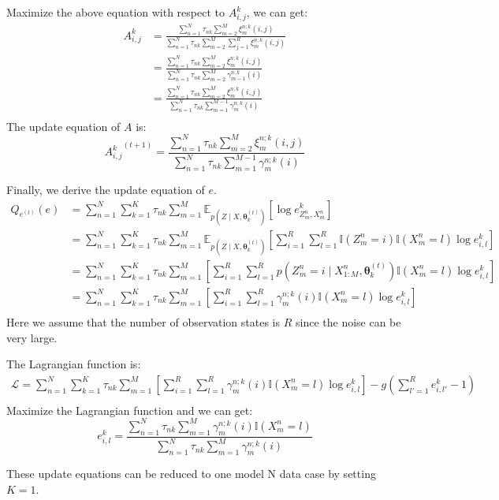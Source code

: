 \documentclass[12pt]{article}
\newenvironment{problem}[2][Problem]{\begin{trivlist}
\item[\hskip \labelsep {\bfseries #1}\hskip \labelsep {\bfseries #2.}]}{\end{trivlist}}
\begin{document}
\begin{problem}{2.7.21}
Maximize the above equation with respect to $A^k_{i,j}$, we can get:
\begin{align*}
    A^k_{i,j}&= \frac{\sum_{n=1}^{N} \tau_{nk} \sum_{m=2}^{M} \xi_{m}^{n;k}(i,j)}
                     {\sum_{n=1}^{N} \tau_{nk} \sum_{m=2}^{M} \sum_{j=1}^{R} \xi_{m}^{n;k}(i,j)} \\
             &= \frac{\sum_{n=1}^{N} \tau_{nk} \sum_{m=2}^{M} \xi_{m}^{n;k}(i,j)}
                     {\sum_{n=1}^{N} \tau_{nk} \sum_{m=2}^{M} \gamma_{m-1}^{n;k}(i)} \\
             &= \frac{\sum_{n=1}^{N} \tau_{nk} \sum_{m=2}^{M} \xi_{m}^{n;k}(i,j)}
                     {\sum_{n=1}^{N} \tau_{nk} \sum_{m=1}^{M-1} \gamma_{m}^{n;k}(i)} \\
\end{align*}
The update equation of $A$ is:
\begin{equation}
    {A^k_{i,j}}^{(t+1)} = 
        \frac{\sum_{n=1}^{N} \tau_{nk} \sum_{m=2}^{M} \xi_{m}^{n;k}(i,j)}
             {\sum_{n=1}^{N} \tau_{nk} \sum_{m=1}^{M-1} \gamma_{m}^{n;k}(i)}
\end{equation}

Finally, we derive the update equation of $e$.
\begin{align*}
    Q_{e^{(t)}}(e) &= \sum_{n=1}^{N} \sum_{k=1}^{K} \tau_{nk} \sum_{m=1}^{M} 
        \mathbb{E}_{p(Z\mid X, \bm{\theta}^{(t)}_k)}[\log e^k_{Z^n_{m},X^n_m}] \\
    &= \sum_{n=1}^{N} \sum_{k=1}^{K} \tau_{nk} \sum_{m=1}^{M} 
        \mathbb{E}_{p(Z\mid X, \bm{\theta}^{(t)}_k)}
            [\sum_{i=1}^{R}\sum_{l=1}^{R}
            \mathbb{I}(Z^n_{m} = i)\mathbb{I}(X^n_{m} = l)\log e^k_{i,l}] \\
    &= \sum_{n=1}^{N} \sum_{k=1}^{K} \tau_{nk} \sum_{m=1}^{M} 
        [\sum_{i=1}^{R}\sum_{l=1}^{R} p(Z^n_{m} = i\mid X^{n}_{1:M}, \bm{\theta}^{(t)}_k)
        \mathbb{I}(X^n_{m} = l)\log e^k_{i,l}] \\
    &= \sum_{n=1}^{N} \sum_{k=1}^{K} \tau_{nk} \sum_{m=1}^{M} 
        [\sum_{i=1}^{R}\sum_{l=1}^{R} \gamma_{m}^{n;k}(i)
        \mathbb{I}(X^n_{m} = l)\log e^k_{i,l}] \\
\end{align*}
Here we assume that the number of observation states is $R$ since the noise can
be very large.

The Lagrangian function is:
\begin{align*}
    \mathcal{L} = 
        \sum_{n=1}^{N} \sum_{k=1}^{K} \tau_{nk} \sum_{m=1}^{M} 
            [\sum_{i=1}^{R}\sum_{l=1}^{R} \gamma_{m}^{n;k}(i)
            \mathbb{I}(X^n_{m} = l)\log e^k_{i,l}] 
        - g(\sum_{l'=1}^{R}e^k_{i,l'} - 1)\\
\end{align*}
Maximize the Lagrangian function and we can get:
\begin{equation}
    e^k_{i,l} = 
    \frac{\sum_{n=1}^{N}\tau_{nk} \sum_{m=1}^{M} \gamma_{m}^{n;k}(i)\mathbb{I}(X^n_{m} = l)}
        {\sum_{n=1}^{N}\tau_{nk} \sum_{m=1}^{M} \gamma_{m}^{n;k}(i)}
\end{equation}

These update equations can be reduced to one model N data case by setting $K = 1$.
\end{problem}
\end{document}
